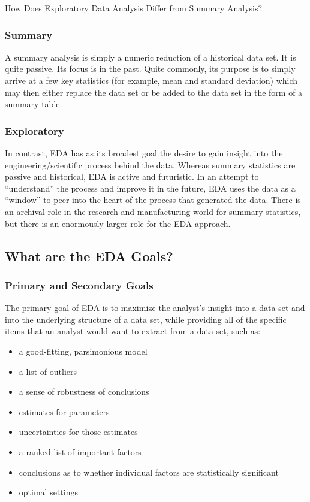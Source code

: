 \documentclass[]{book}
\providecommand{\tightlist}{%
  \setlength{\itemsep}{0pt}\setlength{\parskip}{0pt}}
\theoremstyle{definition}
\theoremstyle{definition}
\theoremstyle{definition}
\theoremstyle{remark}
\begin{document}
How Does Exploratory Data Analysis Differ from Summary Analysis?

\subsubsection{Summary}\label{summary}

A summary analysis is simply a numeric reduction of a historical data
set. It is quite passive. Its focus is in the past. Quite commonly, its
purpose is to simply arrive at a few key statistics (for example, mean
and standard deviation) which may then either replace the data set or be
added to the data set in the form of a summary table.

\subsubsection{Exploratory}\label{exploratory}

In contrast, EDA has as its broadest goal the desire to gain insight
into the engineering/scientific process behind the data. Whereas summary
statistics are passive and historical, EDA is active and futuristic. In
an attempt to ``understand'' the process and improve it in the future,
EDA uses the data as a ``window'' to peer into the heart of the process
that generated the data. There is an archival role in the research and
manufacturing world for summary statistics, but there is an enormously
larger role for the EDA approach.

\subsection{What are the EDA Goals?}\label{what-are-the-eda-goals}

\subsubsection{Primary and Secondary
Goals}\label{primary-and-secondary-goals}

The primary goal of EDA is to maximize the analyst's insight into a data
set and into the underlying structure of a data set, while providing all
of the specific items that an analyst would want to extract from a data
set, such as:

\begin{itemize}
\tightlist
\item
  a good-fitting, parsimonious model
\item
  a list of outliers
\item
  a sense of robustness of conclusions
\item
  estimates for parameters
\item
  uncertainties for those estimates
\item
  a ranked list of important factors
\item
  conclusions as to whether individual factors are statistically
  significant
\item
  optimal settings
\end{itemize}
\end{document}
